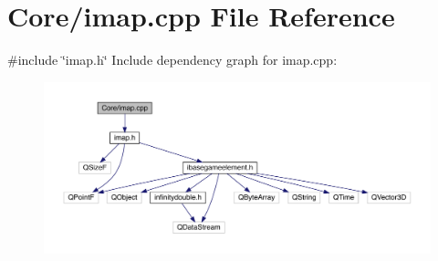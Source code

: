 \hypertarget{a00050}{}\section{Core/imap.cpp File Reference}
\label{a00050}
{\ttfamily \#include \char`\"{}imap.\+h\char`\"{}}\newline
Include dependency graph for imap.\+cpp\+:
\nopagebreak
\begin{figure}[H]
\begin{center}
\leavevmode
\includegraphics[width=350pt]{d2/d79/a00051}
\end{center}
\end{figure}
